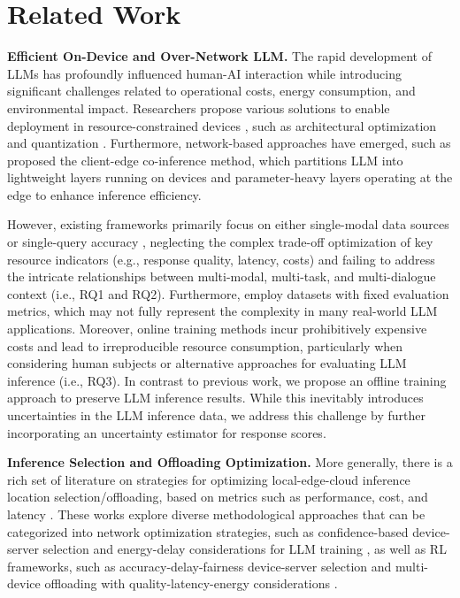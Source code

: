 \section{Related Work}
\label{Sec. Related Work}

\textbf{Efficient On-Device and Over-Network LLM.} The rapid development of LLMs has profoundly influenced human-AI interaction while introducing significant challenges related to operational costs, energy consumption, and environmental impact. Researchers propose various solutions to enable deployment in resource-constrained devices \cite{chen2023frugalgpt}, such as architectural optimization \cite{chu2023mobilevlm} and quantization \cite{lin2024awq}. Furthermore, network-based approaches have emerged, such as \cite{shen2024large} proposed the client-edge co-inference method, which partitions LLM into lightweight layers running on devices and parameter-heavy layers operating at the edge to enhance inference efficiency.

However, existing frameworks primarily focus on either single-modal data sources or single-query accuracy \cite{zhang2024treacle}, neglecting the complex trade-off optimization of key resource indicators (e.g., response quality, latency, costs) \cite{dong2024creating} and failing to address the intricate relationships between multi-modal, multi-task, and multi-dialogue context (i.e., RQ1 and RQ2). Furthermore, \cite{zhang2024treacle, he2024large} employ datasets with fixed evaluation metrics, which may not fully represent the complexity in many real-world LLM applications. Moreover, online training methods incur prohibitively expensive costs and lead to irreproducible resource consumption, particularly when considering human subjects or alternative approaches for evaluating LLM inference (i.e., RQ3). In contrast to previous work, we propose an offline training approach to preserve LLM inference results. While this inevitably introduces uncertainties in the LLM inference data, we address this challenge by further incorporating an uncertainty estimator for response scores.


\noindent\textbf{Inference Selection and Offloading Optimization.} More generally, there is a rich set of literature on strategies for optimizing local-edge-cloud inference location selection/offloading, based on metrics such as performance, cost, and latency \cite{singhal2024resource}. These works explore diverse methodological approaches that can be categorized into network optimization strategies, such as confidence-based device-server selection \cite{al2024regret} and energy-delay considerations for LLM training \cite{liu2024resource}, as well as RL frameworks, such as accuracy-delay-fairness device-server selection \cite{beytur2024optimization} and multi-device offloading with quality-latency-energy considerations \cite{chen2024tilesr}.

